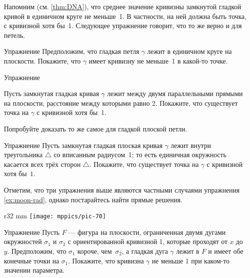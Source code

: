 Напомним (см. \ref{thm:DNA}), что среднее значение кривизны замкнутой гладкой кривой в единичном круге не меньше~1.
В частности, на ней должна быть точка, с кривизной хотя бы~1.
Следующее упражнение говорит, что то же верно и для петель.

\begin{thm}{Упражнение}\label{ex:in-circle}
Предположим, что гладкая петля $\gamma$ лежит в единичном круге на плоскости.
Покажите, что $\gamma$ имеет кривизну не меньше~1 в какой-то точке.
\end{thm}


\begin{thm}{Упражнение}\label{ex:between-parallels-1}
{\sloppy
Пусть замкнутая гладкая кривая $\gamma$ лежит между двумя параллельными прямыми на плоскости, расстояние между которыми равно 2.
Покажите, что существует точка на $\gamma$ с кривизной хотя бы~1.

}

Попробуйте доказать то же самое для гладкой плоской петли.
\end{thm}

\begin{thm}{Упражнение}\label{ex:in-triangle}
Пусть замкнутая гладкая плоская кривая $\gamma$ лежит внутри треугольника $\triangle$ со вписанным радиусом~1; то есть единичная окружность касается всех трёх сторон $\triangle$. 
Покажите, что существует точка на $\gamma$ с кривизной хотя бы~$1$.
\end{thm}

Отметим, что три упражнения выше являются частными случаями упражнения \ref{ex:moon-rad},
однако постарайтесь найти прямые решения.

{

\begin{wrapfigure}{r}{32 mm}
\vskip-4mm
\centering
\texttt{[image: mppics/pic-70]}
\vskip0mm
\end{wrapfigure}

\begin{thm}{Упражнение}\label{ex:lens}
Пусть $F$ --- фигура на плоскости, ограниченная двумя дугами окружностей $\sigma_1$ и $\sigma_2$ с ориентированной кривизной 1, которые проходят от $x$ до~$y$.
Предположим, что $\sigma_1$ короче, чем~$\sigma_2$,
а гладкая дуга $\gamma$ лежит в $F$ и имеет обе конечные точки на $\sigma_1$.
Покажите, что кривизна $\gamma$ не меньше 1 при каком-то значении параметра.

\end{thm}

}

